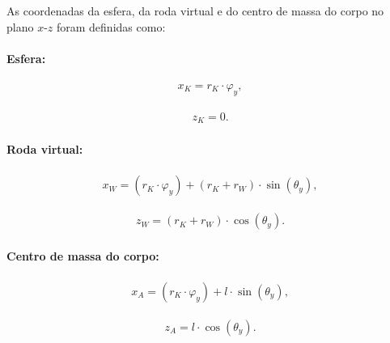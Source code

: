 As coordenadas da esfera, da roda virtual e do centro de massa do corpo no plano $x$-$z$ foram definidas como:

\paragraph{Esfera:}

\begin{equation}
    \label{eq:2}
    \begin{aligned}
        x_K = r_K \cdot \varphi_y,
    \end{aligned}
\end{equation}

\begin{equation}
    \label{eq:3}
    \begin{aligned}
        z_K = 0.
    \end{aligned}
\end{equation}

\paragraph{Roda virtual:}

\begin{equation}
    \label{eq:4}
    \begin{aligned}
        x_W = (r_K \cdot \varphi_y) + (r_K + r_W) \cdot \sin{(\theta_y)},
    \end{aligned}
\end{equation}

\begin{equation}
    \label{eq:5}
    \begin{aligned}
        z_W = (r_K + r_W) \cdot \cos{(\theta_y)}.
    \end{aligned}
\end{equation}

\paragraph{Centro de massa do corpo:}

\begin{equation}
    \label{eq:6}
    \begin{aligned}
        x_A = (r_K \cdot \varphi_y) + l \cdot \sin{(\theta_y)},
    \end{aligned}
\end{equation}

\begin{equation}
    \label{eq:7}
    \begin{aligned}
        z_A = l \cdot \cos{(\theta_y)}.
    \end{aligned}
\end{equation}

